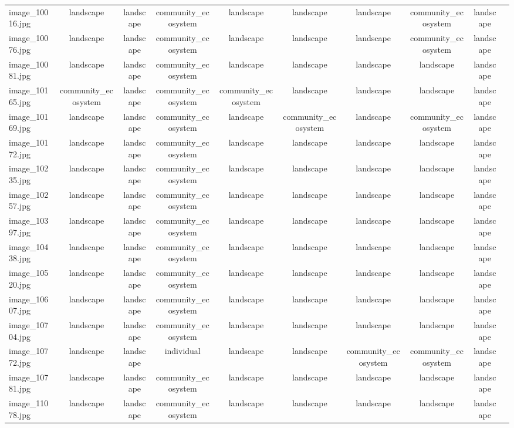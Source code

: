\documentclass[hidelinks, 11pt]{article}
\begin{document}
\begin{longtable}{@{}lccccccccc@{}}
image\_10016.jpg & landscape & landscape & community\_ecosystem & landscape & landscape & landscape & community\_ecosystem & landscape \\
image\_10076.jpg & landscape & landscape & community\_ecosystem & landscape & landscape & landscape & community\_ecosystem & landscape \\
image\_10081.jpg & landscape & landscape & community\_ecosystem & landscape & landscape & landscape & landscape & landscape \\
image\_10165.jpg & community\_ecosystem & landscape & community\_ecosystem & community\_ecosystem & landscape & landscape & landscape & landscape \\
image\_10169.jpg & landscape & landscape & community\_ecosystem & landscape & community\_ecosystem & landscape & community\_ecosystem & landscape \\
image\_10172.jpg & landscape & landscape & community\_ecosystem & landscape & landscape & landscape & landscape & landscape \\
image\_10235.jpg & landscape & landscape & community\_ecosystem & landscape & landscape & landscape & landscape & landscape \\
image\_10257.jpg & landscape & landscape & community\_ecosystem & landscape & landscape & landscape & landscape & landscape \\
image\_10397.jpg & landscape & landscape & community\_ecosystem & landscape & landscape & landscape & landscape & landscape \\
image\_10438.jpg & landscape & landscape & community\_ecosystem & landscape & landscape & landscape & landscape & landscape \\
image\_10520.jpg & landscape & landscape & community\_ecosystem & landscape & landscape & landscape & landscape & landscape \\
image\_10607.jpg & landscape & landscape & community\_ecosystem & landscape & landscape & landscape & landscape & landscape \\
image\_10704.jpg & landscape & landscape & community\_ecosystem & landscape & landscape & landscape & landscape & landscape \\
image\_10772.jpg & landscape & landscape & individual & landscape & landscape & community\_ecosystem & community\_ecosystem & landscape \\
image\_10781.jpg & landscape & landscape & community\_ecosystem & landscape & landscape & landscape & landscape & landscape \\
image\_11078.jpg & landscape & landscape & community\_ecosystem & landscape & landscape & landscape & landscape & landscape \\

\end{longtable}
\end{document}

